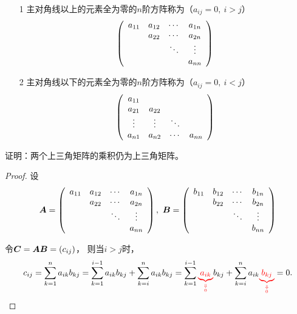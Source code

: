 % 
\begin{dingyi}[三角矩阵]
  \begin{itemize}
  \item[1] 主对角线以上的元素全为零的$n$阶方阵称为（$a_{ij}=0, ~i>j$）
    $$
    \left(
      \begin{array}{cccc}
        a_{11} & a_{12} & \cdots & a_{1n} \\
               & a_{22} & \cdots & a_{2n} \\
               &       & \ddots & \vdots   \\
               &       &     & a_{nn}
      \end{array}
    \right)
    $$
  \item[2] 主对角线以下的元素全为零的$n$阶方阵称为（$a_{ij}=0, ~i<j$）
    $$
    \left(
      \begin{array}{cccc}
        a_{11} &       &     &       \\
        a_{21} & a_{22} &     &  \\
        \vdots   & \vdots   & \ddots &    \\
        a_{n1} & a_{n2} & \cdots & a_{nn}
      \end{array}
    \right)
    $$
  \end{itemize}
\end{dingyi}
\begin{li}
  证明：两个上三角矩阵的乘积仍为上三角矩阵。
\end{li}
\begin{proof}
  设
  $$
  \boldsymbol{A} = \left(
    \begin{array}{cccc}
      a_{11} & a_{12} & \cdots & a_{1n} \\
             & a_{22} & \cdots & a_{2n} \\
             &       & \ddots & \vdots   \\
             &       &     & a_{nn}
    \end{array}
  \right), ~     \boldsymbol{B} = \left(
    \begin{array}{cccc}
      b_{11} & b_{12} & \cdots & b_{1n} \\
             & b_{22} & \cdots & b_{2n} \\
             &       & \ddots & \vdots   \\
             &       &     & b_{nn}
    \end{array}
  \right)
  $$
  
  令$\boldsymbol{C} = \boldsymbol{A}\boldsymbol{B} = (c_{ij})$，
  则当$i>j$时，
  $$
  c_{ij} = \sum_{k=1}^n a_{ik}b_{kj}   
  = \sum_{k=1}^{i-1} a_{ik}b_{kj}  + \sum_{k=i}^n a_{ik}b_{kj}  
  = \sum_{k=1}^{i-1} \textcolor{red}{\underbrace{a_{ik}}_{\Downarrow\atop0}}b_{kj}  
  + \sum_{k=i}^n a_{ik}\textcolor{red}{\underbrace{b_{kj}}_{\Downarrow\atop0}}  = 0.
  $$
\end{proof}

